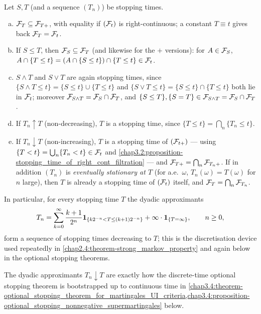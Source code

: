 \begin{properties} \label{chap3.2:properties-algebra_of_stopping_times}  \\
Let $S,T$ (and a sequence $(T_n)$) be stopping times.
\begin{enumerate}[(a)]
    \item $\mathcal{F}_T\subseteq\mathcal{F}_{T+}$, with equality if $(\mathcal{F}_t)$ is right-continuous; a constant $T\equiv t$ gives back $\mathcal{F}_T=\mathcal{F}_t$.
    \item If $S\le T$, then $\mathcal{F}_S\subseteq\mathcal{F}_T$ (and likewise for the $+$ versions): for $A\in\mathcal{F}_S$, $A\cap\{T\le t\}=(A\cap\{S\le t\})\cap\{T\le t\}\in\mathcal{F}_t$.
    \item $S\wedge T$ and $S\vee T$ are again stopping times, since $\{S\wedge T\le t\}=\{S\le t\}\cup\{T\le t\}$ and $\{S\vee T\le t\}=\{S\le t\}\cap\{T\le t\}$ both lie in $\mathcal{F}_t$; moreover $\mathcal{F}_{S\wedge T}=\mathcal{F}_S\cap\mathcal{F}_T$, and $\{S\le T\}, \{S=T\}\in\mathcal{F}_{S\wedge T}=\mathcal{F}_S\cap\mathcal{F}_T$.
    \item If $T_n\uparrow T$ (non-decreasing), $T$ is a stopping time, since $\{T\le t\}=\bigcap_n\{T_n\le t\}$.
    \item If $T_n\downarrow T$ (non-increasing), $T$ is a stopping time of $(\mathcal{F}_{t+})$ --- using $\{T<t\}=\bigcup_n\{T_n<t\}\in\mathcal{F}_t$ and \cref{chap3.2:proposition-stopping_time_of_right_cont_filtration} --- and $\mathcal{F}_{T+}=\bigcap_n\mathcal{F}_{T_n+}$. If in addition $(T_n)$ is \emph{eventually stationary at $T$} (for a.e.\ $\omega$, $T_n(\omega)=T(\omega)$ for $n$ large), then $T$ is already a stopping time of $(\mathcal{F}_t)$ itself, and $\mathcal{F}_T=\bigcap_n\mathcal{F}_{T_n}$.
\end{enumerate}
In particular, for every stopping time $T$ the dyadic approximants
$$T_n=\sum_{k=0}^\infty\frac{k+1}{2^n}\mathbf{1}_{\{k2^{-n}<T\le(k+1)2^{-n}\}}+\infty\cdot\mathbf{1}_{\{T=\infty\}}, \qquad n\ge0,$$
form a sequence of stopping times decreasing to $T$; this is the discretisation device used repeatedly in \cref{chap2.4:theorem-strong_markov_property} and again below in the optional stopping theorems.
\end{properties}
\begin{usedin} The dyadic approximants $T_n\downarrow T$ are exactly how the discrete-time optional stopping theorem is bootstrapped up to continuous time in \cref{chap3.4:theorem-optional_stopping_theorem_for_martingales_UI_criteria,chap3.4:proposition-optional_stopping_nonnegative_supermartingales} below. \end{usedin}

